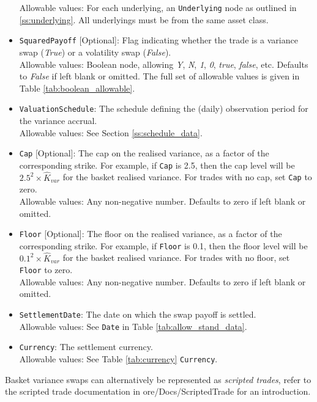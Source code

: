 \begin{itemize}
    Allowable values: For each underlying, an \lstinline!Underlying! node as outlined in
    \ref{ss:underlying}. All underlyings must be from the same asset class.
  \item{} \lstinline!SquaredPayoff! [Optional]: Flag indicating whether the trade is a variance swap (\emph{True})
  or a volatility swap (\emph{False}). \\
  Allowable values: Boolean node, allowing \emph{Y}, \emph{N}, \emph{1}, \emph{0}, \emph{true}, \emph{false}, etc.
  Defaults to \emph{False} if left blank or omitted. The full set of allowable values is given in Table \ref{tab:boolean_allowable}.
\item{} \lstinline!ValuationSchedule!: The schedule defining the (daily) observation period for the variance accrual. \\
    Allowable values: See Section \ref{ss:schedule_data}.
  \item{} \lstinline!Cap! [Optional]: The cap on the realised variance, as a factor of the corresponding strike. For example,
  if \lstinline!Cap! is 2.5, then the cap level will be $2.5^2 \times \hat{K}_{var}$ for the basket realised variance.
  For trades with no cap, set \lstinline!Cap! to zero. \\
    Allowable values: Any non-negative number. Defaults to zero if left blank or omitted.
  \item{} \lstinline!Floor! [Optional]:  The floor on the realised variance, as a factor of the corresponding strike. For example,
  if \lstinline!Floor! is 0.1, then the floor level will be $0.1^2 \times \hat{K}_{var}$ for the basket realised variance.
  For trades with no floor, set \lstinline!Floor! to zero. \\
    Allowable values: Any non-negative number. Defaults to zero if left blank or omitted.
  \item{} \lstinline!SettlementDate!: The date on which the swap payoff is settled. \\
    Allowable values: See \lstinline!Date! in Table \ref{tab:allow_stand_data}.
  \item{} \lstinline!Currency!: The settlement currency. \\
    Allowable values: See Table \ref{tab:currency} \lstinline!Currency!.
\end{itemize}

Basket variance swaps can alternatively be represented as {\em scripted trades}, refer to the scripted trade documentation in
ore/Docs/ScriptedTrade for an introduction.

